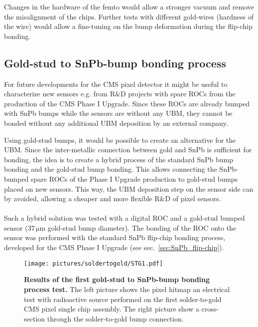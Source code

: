 Changes in the hardware of the femto would allow a stronger vacuum and remove the misalignment of the chips. Further tests with different gold-wires (hardness of the wire) would allow a fine-tuning on the bump deformation during the flip-chip bonding.
 
\subsection{Gold-stud to SnPb-bump bonding process}
For future developments for the \ac{CMS} pixel detector it might be useful to characterize new sensors e.g. from R$\&$D projects with spare \ac{ROC}s from the production of the \ac{CMS} Phase I Upgrade. Since these \ac{ROC}s are already bumped with SnPb bumps while the sensors are without any \ac{UBM}, they cannot be bonded without any additional \ac{UBM} deposition by an external company.

Using gold-stud bumps, it would be possible to create an alternative for the \ac{UBM}. Since the inter-metallic connection between gold and SnPb is sufficient for bonding, the idea is to create a hybrid process of the standard SnPb bump bonding and the gold-stud bump bonding. This allows connecting the SnPb-bumped spare \ac{ROC}s of the Phase I Upgrade production to gold-stud bumps placed on new sensors. This way, the \ac{UBM} deposition step on the sensor side can by avoided, allowing a cheaper and more flexible R$\&$D of pixel sensors.
\\
\\Such a hybrid solution was tested with a digital \ac{ROC} and a gold-stud bumped sensor ($37\,\si{\micro \meter}$ gold-stud bump diameter). The bonding of the \ac{ROC} onto the sensor was performed with the standard SnPb flip-chip bonding process, developed for the CMS Phase I Upgrade (see sec.~\ref{sec:SnPb_flip-chip}).
\begin{figure}
\begin{center}
\texttt{[image: pictures/soldertogold/STG1.pdf]}
\end{center}
\caption[Results of the first gold-stud to SnPb-bump bonding process test]{\textbf{Results of the first gold-stud to SnPb-bump bonding process test.} The left picture shows the pixel hitmap an electrical test with radioactive source performed on the first solder-to-gold \ac{CMS} pixel single chip assembly. The right picture show a cross-section through the solder-to-gold bump connection.}\label{fig:SnPb_to_gold}
\end{figure}


